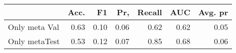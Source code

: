 \begin{tabular}{lrrrrrr}
\toprule
{} &  Acc. &    F1 &   Pr, &  Recall &   AUC &  Avg. pr \\
\midrule
Only meta Val  &  0.63 &  0.10 &  0.06 &    0.62 &  0.62 &     0.05 \\
Only metaTest  &  0.53 &  0.12 &  0.07 &    0.85 &  0.68 &     0.06 \\
\bottomrule
\end{tabular}
